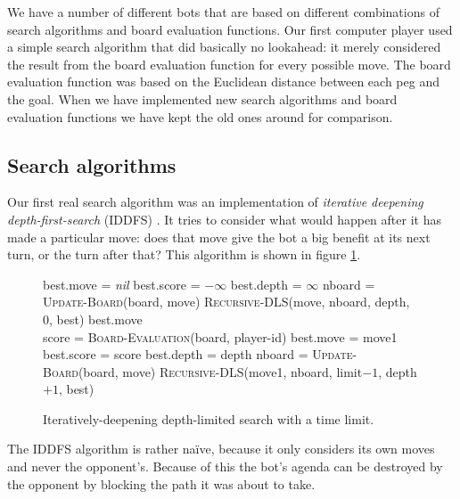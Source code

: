 We have a number of different bots that are based on different
combinations of search algorithms and board evaluation functions. Our
first computer player used a simple search algorithm that did
basically no lookahead: it merely considered the result from the board
evaluation function for every possible move. The board evaluation
function was based on the Euclidean distance between each peg and the
goal. When we have implemented new search algorithms and board
evaluation functions we have kept the old ones around for comparison.

\subsection{Search algorithms}

Our first real search algorithm was an implementation of
\emph{iterative deepening depth-first-search} (IDDFS) \cite{aimodern}.
It tries to consider what would happen after it has made a particular
move: does that move give the bot a big benefit at its next turn, or
the turn after that? This algorithm is shown in figure \ref{iddfs}.

\begin{figure}
\begin{algorithmic}
\State best.move = \emph{nil}
\State best.score = $-\infty$
\State best.depth = $\infty$
  \State nboard = \textsc{Update-Board}(board, move)
  \State \textsc{Recursive-DLS}(move, nboard, depth, 0, best)
 \EndFor
  \State \Return best.move
 \EndIf
\EndFor
\EndFunction
\\
\State score = \textsc{Board-Evaluation}(board, player-id)
\State best.move = move1
\State best.score = score
\State best.depth = depth
\EndIf
{}
\State \Return
\EndIf
{}
 \State nboard = \textsc{Update-Board}(board, move)
 \State \textsc{Recursive-DLS}(move1, nboard, limit$-1$, depth$+1$, best)
\EndFor
\EndFunction
\end{algorithmic}
\caption{Iteratively-deepening depth-limited search with a time limit.}
\label{iddfs}
\end{figure}

The IDDFS algorithm is rather na\"ive, because it only considers its
own moves and never the opponent's. Because of this the bot's agenda
can be destroyed by the opponent by blocking the path it was about to
take.

